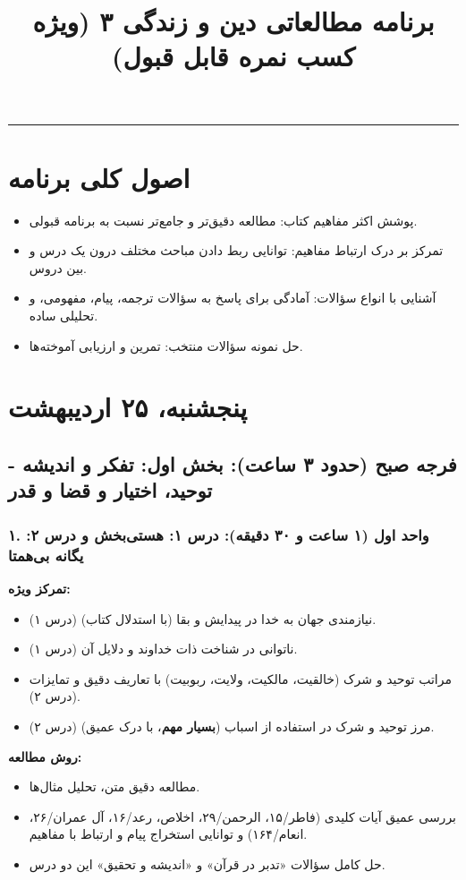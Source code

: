 \documentclass[12pt,a4paper]{article}
\title{برنامه مطالعاتی دین و زندگی ۳ (ویژه کسب نمره قابل قبول)}
\author{} %
\date{}    %
\begin{document}
\maketitle
\begin{center}
\rule{0.8\textwidth}{0.4pt}
\end{center}
\vspace{0.5cm}

\section*{اصول کلی برنامه}
\begin{itemize}
    \item پوشش اکثر مفاهیم کتاب: مطالعه دقیق‌تر و جامع‌تر نسبت به برنامه قبولی.
    \item تمرکز بر درک ارتباط مفاهیم: توانایی ربط دادن مباحث مختلف درون یک درس و بین دروس.
    \item آشنایی با انواع سؤالات: آمادگی برای پاسخ به سؤالات ترجمه، پیام، مفهومی، و تحلیلی ساده.
    \item حل نمونه سؤالات منتخب: تمرین و ارزیابی آموخته‌ها.
\end{itemize}

\hrulefill
\section*{پنجشنبه، ۲۵ اردیبهشت}

\subsection*{فرجه صبح (حدود ۳ ساعت): بخش اول: تفکر و اندیشه - توحید، اختیار و قضا و قدر}

\subsubsection*{۱. واحد اول (۱ ساعت و ۳۰ دقیقه): درس ۱: هستی‌بخش و درس ۲: یگانه بی‌همتا}
\textbf{تمرکز ویژه:}
\begin{itemize}
    \item نیازمندی جهان به خدا در پیدایش و بقا (با استدلال کتاب) (درس ۱).
    \item ناتوانی در شناخت ذات خداوند و دلایل آن (درس ۱).
    \item مراتب توحید و شرک (خالقیت، مالکیت، ولایت، ربوبیت) با تعاریف دقیق و تمایزات (درس ۲).
    \item مرز توحید و شرک در استفاده از اسباب (\textbf{بسیار مهم}، با درک عمیق) (درس ۲).
\end{itemize}
\textbf{روش مطالعه:}
\begin{itemize}
    \item مطالعه دقیق متن، تحلیل مثال‌ها.
    \item بررسی عمیق آیات کلیدی (فاطر/۱۵، الرحمن/۲۹، اخلاص، رعد/۱۶، آل عمران/۲۶، انعام/۱۶۴) و توانایی استخراج پیام و ارتباط با مفاهیم.
    \item حل کامل سؤالات «تدبر در قرآن» و «اندیشه و تحقیق» این دو درس.
\end{itemize}
\end{document}
